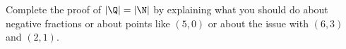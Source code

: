 Complete the proof of $|\Q| = |\N|$ by explaining what you should
do about negative fractions or about points like $(5, 0)$
or about the issue with $(6,3)$ and $(2,1)$.
